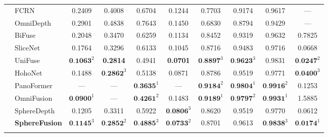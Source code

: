 \begin{table*} [ht]
\begin{center}
{\begin{tabular}{l|lcccc|ccc|c}
			\noalign{\smallskip}
			\hline
			\noalign{\smallskip}
			
			\multirow{11}{*}{M3D} 
			& FCRN  \cite{laina2016deeper}    & 0.2409 & 0.4008 & 0.6704 & 0.1244 & 0.7703 & 0.9174 & 0.9617 & ---\\ 
			& OmniDepth \cite{zioulis2018omnidepth} & 0.2901 & 0.4838 & 0.7643 & 0.1450 & 0.6830 & 0.8794 & 0.9429 & ---\\ 
			& BiFuse \cite{wang2020bifuse}  & 0.2048 & 0.3470 & 0.6259 & 0.1134 & 0.8452 & 0.9319 & 0.9632 & 0.7825\\ 
			& SliceNet \cite{pintore2021slicenet} & 0.1764 & 0.3296 & 0.6133 & 0.1045 & 0.8716 & 0.9483 & 0.9716 & 0.0668 \\
			& UniFuse \cite{jiang2021unifuse} & $\textbf{0.1063}^2$ & \textbf{0.2814} & 0.4941 & \textbf{0.0701}   & $\textbf{0.8897}^3$     & $\textbf{0.9623}^3$     & 0.9831  & $\textbf{0.0247}^2$    \\
			& HohoNet \cite{sun2021hohonet} & 0.1488 & $\textbf{0.2862}^3$ & 0.5138 & 0.0871 & 0.8786 & 0.9519 & 0.9771 & $\textbf{0.0400}^3$ \\ 
			& PanoFormer \cite{shen2022panoformer} & --- & --- & $\textbf{0.3635}^1$ &  ---  & $\textbf{0.9184}^2$     & $\textbf{0.9804}^1$  &  $\textbf{0.9916}^2$   & 0.1253   \\
			& OmniFusion \cite{li2022omnifusion} & $\textbf{0.0900}^1$ & --- & $\textbf{0.4261}^2$ & 0.1483   & $\textbf{0.9189}^1$     & $\textbf{0.9797}^2$     & $\textbf{0.9931}^1$  & 1.5885   \\
			& SphereDepth \cite{yan2022spheredepth} & 0.1205 & 0.3311 & 0.5922 & $\textbf{0.0806}^3$ & 0.8620 & 0.9519 & 0.9770  & 0.0612 \\
			& \textbf{SphereFusion} & $\textbf{0.1145}^3$ & $\textbf{0.2852}^2$ & $\textbf{0.4885}^3$ & $\textbf{0.0733}^2$   & 0.8701     & 0.9613     & $\textbf{0.9838}^3$ & $\textbf{0.0174}^1$  \\
			
			\noalign{\smallskip}
			\hline
			\noalign{\smallskip}
			

\end{tabular}}
\end{center}
\end{table*}
